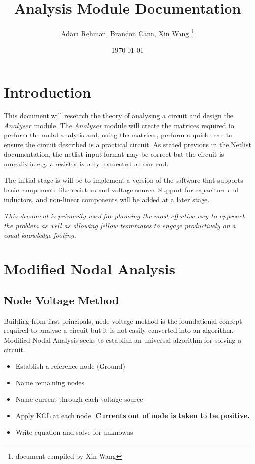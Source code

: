 \documentclass[a4paper, titlepage]{article}
\title{Analysis Module Documentation}
\author{Adam Rehman, Brandon Cann, Xin Wang \thanks{document compiled by Xin Wang}}
\date{ \today}
\begin{document}
    \maketitle
    \tableofcontents
    \pagebreak
    \section{Introduction}
    \par
    This document will research the theory of analysing a circuit and design the $Analyser$ module.
    The $Analyser$ module will create the matrices required to perform the nodal analysis and, using the 
    matrices, perform a quick scan to ensure the circuit described is a practical circuit. As stated previous
    in the Netlist documentation, the netlist input format may be correct but the circuit is unrealistic 
    e.g. a resistor is only connected on one end.
    \par
    The initial stage is will be to implement a version of the software that supports basic components
    like resistors and voltage source. Support for capacitors and inductors, and non-linear components 
    will be added at a later stage.
    \par
    \vfill
    \begin{center}
        \textit{This document is primarily used for planning the most effective way to approach the problem
        as well as allowing fellow teammates to engage productively on a equal knowledge footing. }
    \end{center}
    
    \pagebreak
    \section{Modified Nodal Analysis}
    \subsection{Node Voltage Method}
    Building from first principals, node voltage method is the foundational concept required 
    to analyse a circuit but it is not easily converted into an algorithm. Modified Nodal Analysis seeks
    to establish an universal algorithm for solving a circuit.
    
    \begin{itemize}
        \item Establish a reference node (Ground)
        \item Name remaining nodes
        \item Name current through each voltage source
        \item Apply KCL at each node.\textbf{ Currents out of node is taken to be positive.}
        \item Write equation and solve for unknowns
    \end{itemize}
\end{document}
